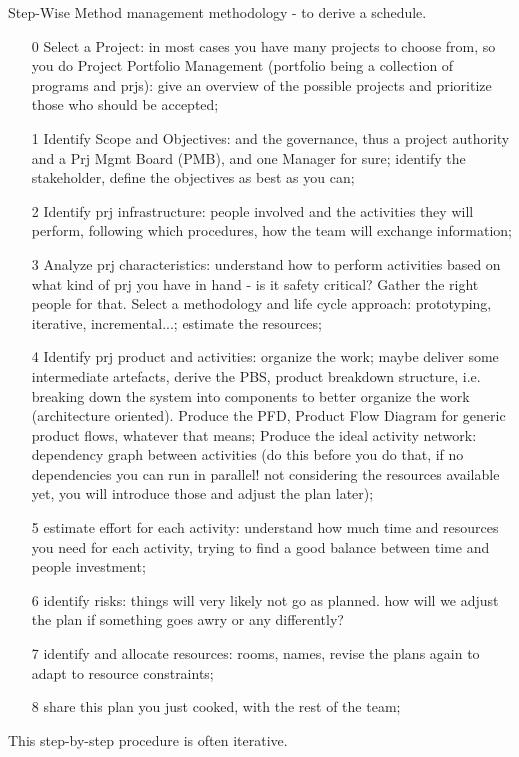 \noindent Step-Wise Method management methodology - to derive a schedule.
\begin{enumerate}
    \item [0] Select a Project: in most cases you have many projects to choose from, so you do Project Portfolio Management (portfolio being a collection of programs and prjs): give an overview of the possible projects and prioritize those who should be accepted;
    \item [1] Identify Scope and Objectives: and the governance, thus a project authority and a Prj Mgmt Board (PMB), and one Manager for sure; identify the stakeholder, define the objectives as best as you can;
    \item [2] Identify prj infrastructure: people involved and the activities they will perform, following which procedures, how the team will exchange information;
    \item [3] Analyze prj characteristics: understand how to perform activities based on what kind of prj you have in hand - is it safety critical? Gather the right people for that. Select a methodology and life cycle approach: prototyping, iterative, incremental...; estimate the resources;
    \item [4] Identify prj product and activities: organize the work; maybe deliver some intermediate artefacts, derive the PBS, product breakdown structure, i.e. breaking down the system into components to better organize the work (architecture oriented). Produce the PFD, Product Flow Diagram for generic product flows, whatever that means; Produce the ideal activity network: dependency graph between activities (do this before you do that, if no dependencies you can run in parallel! not considering the resources available yet, you will introduce those and adjust the plan later);
    \item [5] estimate effort for each activity: understand how much time and resources you need for each activity, trying to find a good balance between time and people investment;
    \item [6] identify risks: things will very likely not go as planned. how will we adjust the plan if something goes awry or any differently?
    \item [7] identify and allocate resources: rooms, names, revise the plans again to adapt to resource constraints;
    \item [8] share this plan you just cooked, with the rest of the team;
\end{enumerate}
This step-by-step procedure is often iterative.

